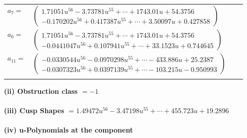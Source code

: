 \documentclass[1p]{elsarticle_modified}
\theoremstyle{definition}
\begin{document}
\begin{tabular}{m{7pt} m{180pt} m{7pt} m{180pt} }
\flushright $a_{7}=$&$\begin{pmatrix}1.71051 u^{56}-3.73781 u^{55}+\cdots+1743.01 u+54.3756\\-0.170202 u^{56}+0.417387 u^{55}+\cdots+3.50097 u+0.427858\end{pmatrix}$ \\
\flushright $a_{6}=$&$\begin{pmatrix}1.71051 u^{56}-3.73781 u^{55}+\cdots+1743.01 u+54.3756\\-0.0441047 u^{56}+0.107941 u^{55}+\cdots+33.1523 u+0.744645\end{pmatrix}$ \\
\flushright $a_{11}=$&$\begin{pmatrix}-0.0330544 u^{56}-0.0970298 u^{55}+\cdots-433.886 u+25.2387\\-0.0307323 u^{56}+0.0397139 u^{55}+\cdots-103.215 u-0.950993\end{pmatrix}$\\&\end{tabular}
\flushleft \textbf{(ii) Obstruction class $= -1$}\\~\\
\flushleft \textbf{(iii) Cusp Shapes $= 1.49472 u^{56}-3.47198 u^{55}+\cdots+455.723 u+19.2896$}\\~\\
\newpage\renewcommand{\arraystretch}{1}
\flushleft \textbf{(iv) u-Polynomials at the component}\newline \\
\end{document}
